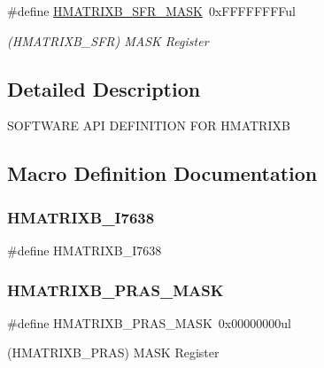 \begin{DoxyCompactItemize}
\item 
\#define \mbox{\hyperlink{group___s_a_m_d21___h_m_a_t_r_i_x_b_ga24827a0f81d62099abddfd9bf3d3fb3b}{H\+M\+A\+T\+R\+I\+X\+B\+\_\+\+S\+F\+R\+\_\+\+M\+A\+SK}}~0x\+F\+F\+F\+F\+F\+F\+F\+Ful
\begin{DoxyCompactList}\small\item\em (H\+M\+A\+T\+R\+I\+X\+B\+\_\+\+S\+FR) M\+A\+SK Register \end{DoxyCompactList}\end{DoxyCompactItemize}


\subsection{Detailed Description}
S\+O\+F\+T\+W\+A\+RE A\+PI D\+E\+F\+I\+N\+I\+T\+I\+ON F\+OR H\+M\+A\+T\+R\+I\+XB 

\subsection{Macro Definition Documentation}
\mbox{\label{group___s_a_m_d21___h_m_a_t_r_i_x_b_ga8913ac76d91200aaaf9a1bc9ddeddd9f}} 
\subsubsection{\texorpdfstring{HMATRIXB\_I7638}{HMATRIXB\_I7638}}
{\footnotesize\ttfamily \#define H\+M\+A\+T\+R\+I\+X\+B\+\_\+\+I7638}

\mbox{\label{group___s_a_m_d21___h_m_a_t_r_i_x_b_ga0b91fa322894f20c4280a0b9e76c9359}} 
\subsubsection{\texorpdfstring{HMATRIXB\_PRAS\_MASK}{HMATRIXB\_PRAS\_MASK}}
{\footnotesize\ttfamily \#define H\+M\+A\+T\+R\+I\+X\+B\+\_\+\+P\+R\+A\+S\+\_\+\+M\+A\+SK~0x00000000ul}



(H\+M\+A\+T\+R\+I\+X\+B\+\_\+\+P\+R\+AS) M\+A\+SK Register 

\mbox{\label{group___s_a_m_d21___h_m_a_t_r_i_x_b_gada8f35a5ebe92757fe031cde38a7761c}} 
